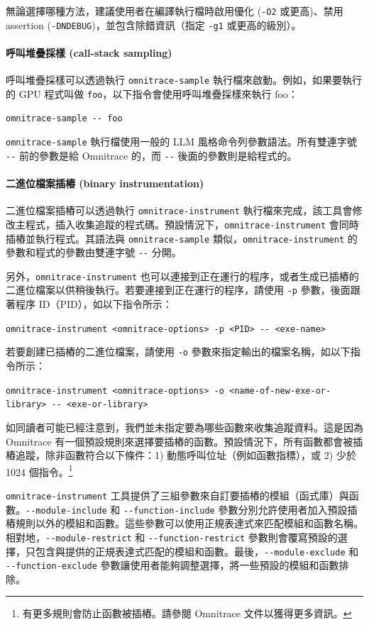無論選擇哪種方法，建議使用者在編譯執行檔時啟用優化 (\lstinline|-O2| 或更高)、禁用 assertion (\lstinline|-DNDEBUG|)，並包含除錯資訊（指定 \lstinline|-g1| 或更高的級別）。

\paragraph{呼叫堆疊採樣 (call-stack sampling)}
呼叫堆疊採樣可以透過執行 \lstinline|omnitrace-sample| 執行檔來啟動。例如，如果要執行的 GPU 程式叫做 \lstinline|foo|，以下指令會使用呼叫堆疊採樣來執行 foo：

\lstinline|omnitrace-sample -- foo|

\lstinline|omnitrace-sample| 執行檔使用一般的 LLM 風格命令列參數語法。所有雙連字號 \lstinline|--| 前的參數是給 Omnitrace 的，而 \lstinline|--| 後面的參數則是給程式的。

\paragraph{二進位檔案插樁 (binary instrumentation)}
二進位檔案插樁可以透過執行 \lstinline|omnitrace-instrument| 執行檔來完成，該工具會修改主程式，插入收集追蹤的程式碼。預設情況下，\lstinline|omnitrace-instrument| 會同時插樁並執行程式。其語法與 \lstinline|omnitrace-sample| 類似，\lstinline|omnitrace-instrument| 的參數和程式的參數由雙連字號 \lstinline|--| 分開。

另外，\lstinline|omnitrace-instrument| 也可以連接到正在運行的程序，或者生成已插樁的二進位檔案以供稍後執行。若要連接到正在運行的程序，請使用 \lstinline|-p| 參數，後面跟著程序 ID（PID），如以下指令所示：

\lstinline|omnitrace-instrument <omnitrace-options> -p <PID> -- <exe-name>|

若要創建已插樁的二進位檔案，請使用 \lstinline|-o| 參數來指定輸出的檔案名稱，如以下指令所示：

\lstinline|omnitrace-instrument <omnitrace-options> -o <name-of-new-exe-or-library> -- <exe-or-library>|

如同讀者可能已經注意到，我們並未指定要為哪些函數來收集追蹤資料。這是因為 Omnitrace 有一個預設規則來選擇要插樁的函數。預設情況下，所有函數都會被插樁追蹤，除非函數符合以下條件：1) 動態呼叫位址（例如函數指標），或 2) 少於 1024 個指令。\footnote{有更多規則會防止函數被插樁。請參閱 Omnitrace 文件以獲得更多資訊。}

\lstinline|omnitrace-instrument| 工具提供了三組參數來自訂要插樁的模組（函式庫）與函數。\lstinline|--module-include| 和 \lstinline|--function-include| 參數分別允許使用者加入預設插樁規則以外的模組和函數。這些參數可以使用正規表達式來匹配模組和函數名稱。相對地，\lstinline|--module-restrict| 和 \lstinline|--function-restrict| 參數則會覆寫預設的選擇，只包含與提供的正規表達式匹配的模組和函數。最後，\lstinline|--module-exclude| 和 \lstinline|--function-exclude| 參數讓使用者能夠調整選擇，將一些預設的模組和函數排除。

